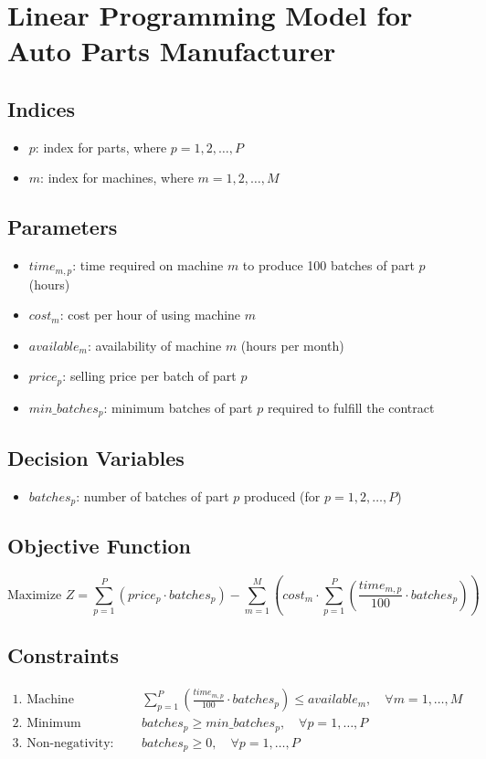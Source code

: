 \documentclass{article}
\begin{document}
\section*{Linear Programming Model for Auto Parts Manufacturer}

\subsection*{Indices}
\begin{itemize}
    \item $p$: index for parts, where $p = 1, 2, \ldots, P$
    \item $m$: index for machines, where $m = 1, 2, \ldots, M$
\end{itemize}

\subsection*{Parameters}
\begin{itemize}
    \item $time_{m,p}$: time required on machine $m$ to produce 100 batches of part $p$ (hours)
    \item $cost_{m}$: cost per hour of using machine $m$
    \item $available_{m}$: availability of machine $m$ (hours per month)
    \item $price_{p}$: selling price per batch of part $p$
    \item $min\_batches_{p}$: minimum batches of part $p$ required to fulfill the contract
\end{itemize}

\subsection*{Decision Variables}
\begin{itemize}
    \item $batches_{p}$: number of batches of part $p$ produced (for $p = 1, 2, \ldots, P$)
\end{itemize}

\subsection*{Objective Function}
\[
\text{Maximize } Z = \sum_{p=1}^{P} (price_{p} \cdot batches_{p}) - \sum_{m=1}^{M} (cost_{m} \cdot \sum_{p=1}^{P} \left( \frac{time_{m,p}}{100} \cdot batches_{p} \right))
\]

\subsection*{Constraints}
\begin{align*}
\text{1. Machine Availability:} & \quad \sum_{p=1}^{P} \left( \frac{time_{m,p}}{100} \cdot batches_{p} \right) \leq available_{m}, \quad \forall m = 1, \ldots, M\\
\text{2. Minimum Production Requirement:} & \quad batches_{p} \geq min\_batches_{p}, \quad \forall p = 1, \ldots, P\\
\text{3. Non-negativity:} & \quad batches_{p} \geq 0, \quad \forall p = 1, \ldots, P
\end{align*}
\end{document}
